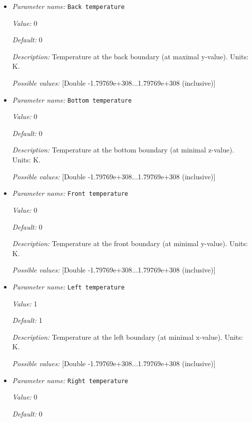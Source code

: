 \begin{itemize}
\item {\it Parameter name:} {\tt Back temperature}


{\it Value:} 0


{\it Default:} 0


{\it Description:} Temperature at the back boundary (at maximal y-value). Units: K.


{\it Possible values:} [Double -1.79769e+308...1.79769e+308 (inclusive)]
\item {\it Parameter name:} {\tt Bottom temperature}


{\it Value:} 0


{\it Default:} 0


{\it Description:} Temperature at the bottom boundary (at minimal z-value). Units: K.


{\it Possible values:} [Double -1.79769e+308...1.79769e+308 (inclusive)]
\item {\it Parameter name:} {\tt Front temperature}


{\it Value:} 0


{\it Default:} 0


{\it Description:} Temperature at the front boundary (at minimal y-value). Units: K.


{\it Possible values:} [Double -1.79769e+308...1.79769e+308 (inclusive)]
\item {\it Parameter name:} {\tt Left temperature}


{\it Value:} 1


{\it Default:} 1


{\it Description:} Temperature at the left boundary (at minimal x-value). Units: K.


{\it Possible values:} [Double -1.79769e+308...1.79769e+308 (inclusive)]
\item {\it Parameter name:} {\tt Right temperature}


{\it Value:} 0


{\it Default:} 0



\end{itemize}
